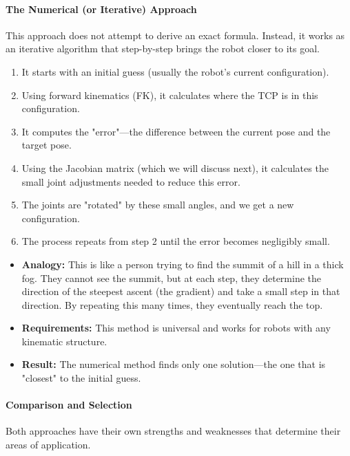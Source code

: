 \paragraph{The Numerical (or Iterative) Approach}
This approach does not attempt to derive an exact formula. Instead, it works as an iterative algorithm that step-by-step brings the robot closer to its goal.
\begin{enumerate}
    \item It starts with an initial guess (usually the robot's current configuration).
    \item Using forward kinematics (FK), it calculates where the TCP is in this configuration.
    \item It computes the "error"—the difference between the current pose and the target pose.
    \item Using the Jacobian matrix (which we will discuss next), it calculates the small joint adjustments needed to reduce this error.
    \item The joints are "rotated" by these small angles, and we get a new configuration.
    \item The process repeats from step 2 until the error becomes negligibly small.
\end{enumerate}
\begin{itemize}
    \item \textbf{Analogy:} This is like a person trying to find the summit of a hill in a thick fog. They cannot see the summit, but at each step, they determine the direction of the steepest ascent (the gradient) and take a small step in that direction. By repeating this many times, they eventually reach the top.
    \item \textbf{Requirements:} This method is universal and works for robots with any kinematic structure.
    \item \textbf{Result:} The numerical method finds only one solution—the one that is "closest" to the initial guess.
\end{itemize}

\paragraph{Comparison and Selection}
Both approaches have their own strengths and weaknesses that determine their areas of application.

